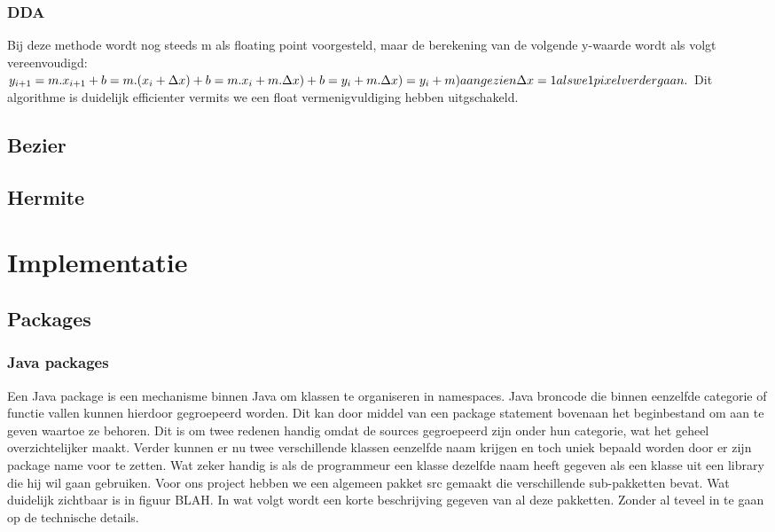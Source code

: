 \documentclass[a4paper,11pt,oneside, titlepage]{article}
\begin{document}
\subsubsection{DDA}
Bij deze methode wordt nog steeds m als floating point voorgesteld, maar de berekening van
de volgende y-waarde wordt als volgt vereenvoudigd:
\begin{math}
y_{i+1} = m.x_{i+1} + b\newline
=m.(x_i + \Delta x) + b\newline
=m.x_i + m.\Delta x) + b\newline
=y_i + m.\Delta x)\newline
=y_i + m) aangezien \Delta x = 1 als we 1 pixel verder gaan. \newline
\end{math} 
Dit algorithme is duidelijk efficienter vermits we een float vermenigvuldiging hebben 
uitgschakeld.
\subsection{Bezier}
\subsection{Hermite}
\newpage
\section{Implementatie}
\subsection{Packages}
\subsubsection{Java packages}
Een Java package is een mechanisme binnen Java om klassen te organiseren in namespaces. 
Java broncode die binnen eenzelfde categorie of functie vallen kunnen hierdoor gegroepeerd 
worden. Dit kan door middel van een package statement bovenaan het beginbestand om aan te 
geven waartoe ze behoren. Dit is om twee redenen handig omdat de sources gegroepeerd zijn
onder hun categorie, wat het geheel overzichtelijker maakt. Verder kunnen er nu twee 
verschillende klassen eenzelfde naam krijgen en toch uniek bepaald worden door er zijn
package name voor te zetten. Wat zeker handig is als de programmeur een klasse dezelfde naam
heeft gegeven als een klasse uit een library die hij wil gaan gebruiken.\newline \newline
Voor ons project hebben we een algemeen pakket src gemaakt die verschillende sub-pakketten bevat.
Wat duidelijk zichtbaar is in figuur BLAH.
In wat volgt wordt een korte beschrijving gegeven van al deze pakketten. Zonder al teveel in
te gaan op de technische details. 
\end{document}
